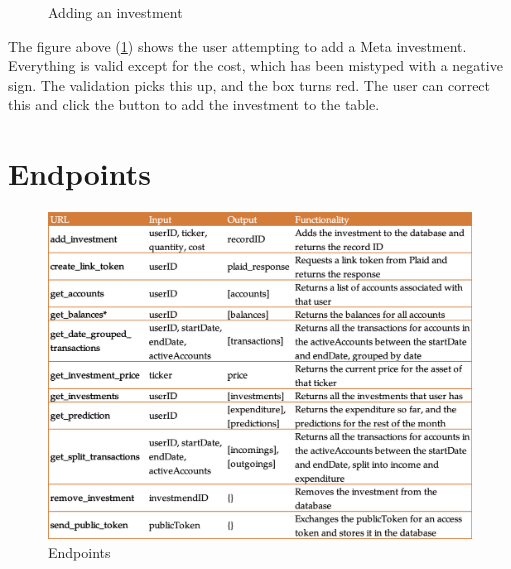 \begin{figure}[H]
	\centering
	\caption{Adding an investment}
	\label{fig:InvestmentsError}
\end{figure}

The figure above (\ref{fig:InvestmentsError}) shows the user attempting to add a Meta investment. Everything is valid except for the cost, which has been mistyped with a negative sign. The validation picks this up, and the box turns red. The user can correct this and click the button to add the investment to the table.

\section{Endpoints}
\begin{figure}
	\centering
	\includegraphics[width=\textwidth]{images/Endpoints.png}
	\caption{Endpoints}
	\label{fig:Endpoints}
\end{figure}
